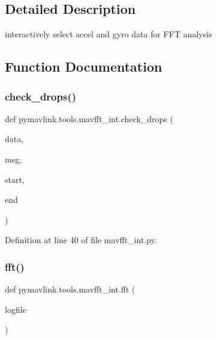 \subsection{Detailed Description}
\begin{DoxyVerb}interactively select accel and gyro data for FFT analysis
\end{DoxyVerb}
 

\subsection{Function Documentation}
\mbox{\label{namespacepymavlink_1_1tools_1_1mavfft__int_a2ae39ff09927a9ada359b47eeb6e4c32}} 
\subsubsection{\texorpdfstring{check\_drops()}{check\_drops()}}
{\footnotesize\ttfamily def pymavlink.\+tools.\+mavfft\+\_\+int.\+check\+\_\+drops (\begin{DoxyParamCaption}\item[{}]{data,  }\item[{}]{msg,  }\item[{}]{start,  }\item[{}]{end }\end{DoxyParamCaption})}



Definition at line 40 of file mavfft\+\_\+int.\+py.

\mbox{\label{namespacepymavlink_1_1tools_1_1mavfft__int_a4fea48da53af74119f00f7ddc66f87fb}} 
\subsubsection{\texorpdfstring{fft()}{fft()}}
{\footnotesize\ttfamily def pymavlink.\+tools.\+mavfft\+\_\+int.\+fft (\begin{DoxyParamCaption}\item[{}]{logfile }\end{DoxyParamCaption})}


